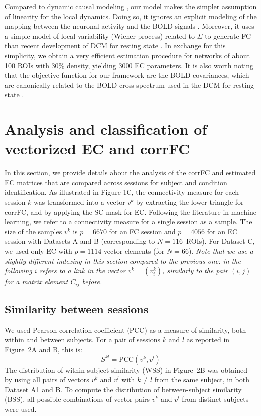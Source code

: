\documentclass{article}
\begin{document}
Compared to dynamic causal modeling \cite{Friston_NeIm_2003, Friston_BCon_2011}, our model makes the simpler assumption of linearity for the local dynamics. Doing so, it ignores an explicit modeling of the mapping between the neuronal activity and the BOLD signals \cite{Stephan_CON_2004}. Moreover, it uses a simple model of local variability (Wiener process) related to $\Sigma$ to generate FC than recent development of DCM for resting state \cite{Friston_NeIm_2014}. In exchange for this simplicity, we obtain a very efficient estimation procedure for networks of about 100 ROIs with 30\% density, yielding 3000 EC parameters. It is also worth noting that the objective function for our framework are the BOLD covariances, which are canonically related to the BOLD cross-spectrum used in the DCM for resting state \cite{Friston_NeIm_2014}.


\section{Analysis and classification of vectorized EC and corrFC}

In this section, we provide details about the analysis of the corrFC and estimated EC matrices that are compared across sessions for subject and condition identification.
As illustrated in Figure 1C, the connectivity measure for each session $k$ was transformed into a vector $v^k$ by extracting the lower triangle for corrFC, and by applying the SC mask for EC. 
Following the literature in machine learning, we refer to a connectivity measure for a single session as a sample.
The size of the samples $v^k$ is $p = 6670$ for an FC session and $p = 4056$ for an EC session with Datasets A and B (corresponding to $N = 116$~ROIs). For Dataset C, we used only EC with $p = 1114$ vector elements (for $N = 66$).
\emph{Note that we use a slightly different indexing in this section compared to the previous one: in the following $i$ refers to a link in the vector $v^k = (v^k_i)$, similarly to the pair $(i,j)$ for a matrix element $C_{ij}$ before.}

\subsection{Similarity between sessions}

We used Pearson correlation coefficient (PCC) as a measure of similarity, both within and between subjects. For a pair of sessions $k$ and $l$ as reported in Figure~2A and B, this is:
\begin{equation} \label{eq_simil}
S^{kl} = \mathrm{PCC}(v^k,v^l)
\end{equation}
The distribution of within-subject similarity (WSS) in Figure~2B was obtained by using all pairs of vectors $v^k$ and $v^l$ with $k \neq l$ from the same subject, in both Dataset A1 and B. To compute the distribution of between-subject similarity (BSS), all possible combinations of vector pairs $v^k$ and $v^l$ from distinct subjects were used.
\end{document}

